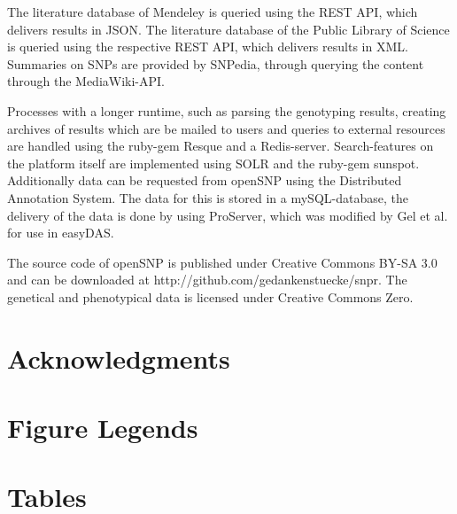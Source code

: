 \documentclass[10pt]{article}
\begin{document}
The literature database of Mendeley is queried using the REST API, which delivers results in JSON. The literature database of the Public Library of Science is queried using the respective REST API, which delivers results in XML. Summaries on SNPs are provided by SNPedia, through querying the content through the MediaWiki-API. 

Processes with a longer runtime, such as parsing the genotyping results, creating archives of results which are be mailed to users and queries to external resources are handled using the ruby-gem Resque and a Redis-server. Search-features on the platform itself are implemented using SOLR and the ruby-gem sunspot. Additionally data can be requested from openSNP using the Distributed Annotation System. The data for this is stored in a mySQL-database, the delivery of the data is done by using ProServer, which was modified by Gel et al. for use in easyDAS.  

The source code of openSNP is published under Creative Commons BY-SA 3.0 and can be downloaded at http://github.com/gedankenstuecke/snpr. The genetical and phenotypical data is licensed under Creative Commons Zero. 


\section*{Acknowledgments}




\section*{Figure Legends}


\section*{Tables}
\end{document}

